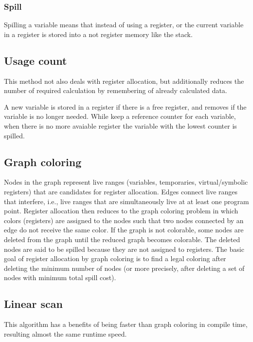 \documentclass[a4paper, 10pt, conference ]{llncs}
\let\cite\parencite
\begin{document}
\subsubsection{Spill}
Spilling a variable means that instead of using a register, or the current variable in a register is stored into a not register memory like the stack.

\subsection{Usage count}

This method not also deals with register allocation, but additionally reduces the number of required calculation by remembering of already calculated data.

A new variable is stored in a register if there is a free register, and removes if the variable is no longer needed. While keep a reference counter for each variable, when there is no more avaiable register the variable with the lowest counter is spilled.\cite{freiburghouse1974register}

\subsection{Graph coloring}

Nodes in the graph represent live ranges (variables, temporaries, virtual/symbolic registers) that are candidates for register allocation. Edges connect live ranges that interfere, i.e., live ranges that are simultaneously live at at least one program point. Register allocation then reduces to the graph coloring problem in which colors (registers) are assigned to the nodes such that two nodes connected by an edge do not receive the same color. If the graph is not colorable, some nodes are deleted from the graph until the reduced graph becomes colorable. The deleted nodes are said to be spilled because they are not assigned to registers. The basic goal of register allocation by graph coloring is to find a legal coloring after deleting the minimum number of nodes (or more precisely, after deleting a set of nodes with minimum total spill cost).\cite{chaitin1981register}\cite{poletto1999linear}

\subsection{Linear scan}

This algorithm has a benefits of being faster than graph coloring in compile time, resulting almost the same runtime speed.
\end{document}
